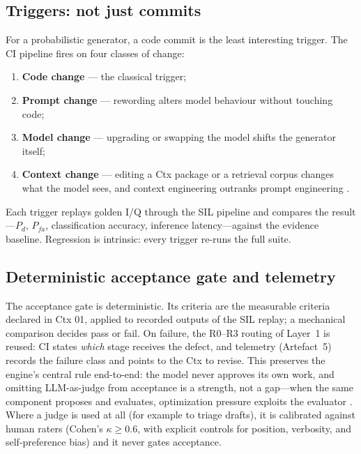 \documentclass[11pt,a4paper]{article}
\begin{document}
\subsection{Triggers: not just commits}
\label{sec:triggers}

For a probabilistic generator, a code commit is the least interesting trigger. The CI pipeline
fires on four classes of change:

\begin{enumerate}
  \item \textbf{Code change} --- the classical trigger;
  \item \textbf{Prompt change} --- rewording alters model behaviour without touching code;
  \item \textbf{Model change} --- upgrading or swapping the model shifts the generator itself;
  \item \textbf{Context change} --- editing a Ctx package or a retrieval corpus changes what the
    model sees, and context engineering outranks prompt engineering \cite{anthropic2026}.
\end{enumerate}

Each trigger replays golden I/Q through the SIL pipeline and compares the result---$P_d$,
$P_{fa}$, classification accuracy, inference latency---against the evidence baseline. Regression
is intrinsic: every trigger re-runs the full suite.

\subsection{Deterministic acceptance gate and telemetry}
\label{sec:gate}

The acceptance gate is deterministic. Its criteria are the measurable criteria declared in Ctx
01, applied to recorded outputs of the SIL replay; a mechanical comparison decides pass or fail.
On failure, the R0--R3 routing of Layer~1 is reused: CI states \emph{which} stage receives the
defect, and telemetry (Artefact~5) records the failure class and points to the Ctx to revise.
This preserves the engine's central rule end-to-end: the model never approves its own work, and
omitting LLM-as-judge from acceptance is a strength, not a gap---when the same component proposes
and evaluates, optimization pressure exploits the evaluator \cite{judge2026}. Where a judge is
used at all (for example to triage drafts), it is calibrated against human raters (Cohen's
$\kappa \geq 0.6$, with explicit controls for position, verbosity, and self-preference bias)
\cite{futureagi2026,judge2026} and it never gates acceptance.
\end{document}
